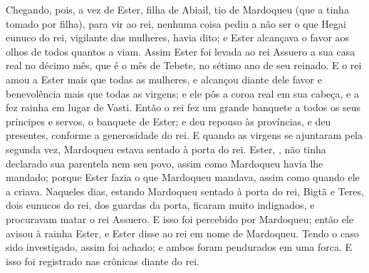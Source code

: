 {  Chegando, pois, a vez de Ester, filha de Abiail, tio de Mardoqueu (que a tinha tomado por filha), para vir ao rei, nenhuma coisa pediu a não ser o que Hegai eunuco do rei, vigilante das mulheres, havia dito; e Ester alcançava o favor aos olhos de todos quantos a viam. %
  Assim Ester foi levada ao rei Assuero a sua casa real no décimo mês, que é o mês de Tebete, no sétimo ano de seu reinado.
  E o rei amou a Ester mais que todas as mulheres, e alcançou diante dele favor e benevolência mais que todas as virgens; e ele pôs a coroa real em sua cabeça, e a fez rainha em lugar de Vasti.
  Então o rei fez um grande banquete a todos os seus príncipes e servos, o banquete de Ester; e deu repouso às províncias, e deu presentes, conforme a generosidade do rei.
  E quando as virgens se ajuntaram pela segunda vez, Mardoqueu estava sentado à porta do rei.
  Ester, {}, não tinha declarado sua parentela nem seu povo, assim como Mardoqueu havia lhe mandado; porque Ester fazia o que Mardoqueu mandava, assim como quando ele a criava.
  Naqueles dias, estando Mardoqueu sentado à porta do rei, Bigtã e Teres, dois eunucos do rei, dos guardas da porta, ficaram muito indignados, e procuravam matar o rei Assuero.
  E isso foi percebido por Mardoqueu; então ele avisou à rainha Ester, e Ester disse ao rei em nome de Mardoqueu.
  Tendo o caso sido investigado, assim foi achado; e ambos foram pendurados em uma forca. E isso foi registrado nas crônicas diante do rei.
\par }

